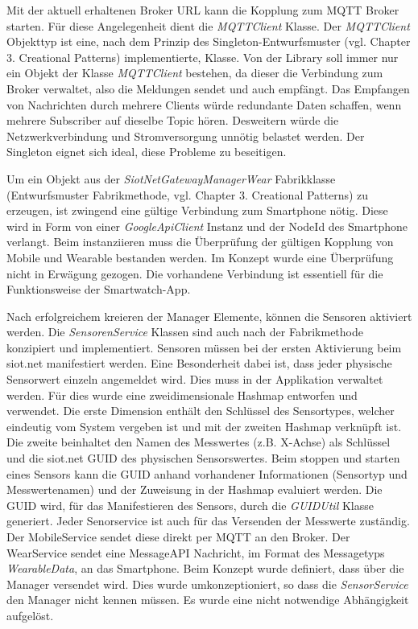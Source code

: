 Mit der aktuell erhaltenen Broker URL kann die Kopplung zum \gls{MQTT} Broker starten. Für diese Angelegenheit dient die \textit{MQTTClient} Klasse. Der \textit{MQTTClient} Objekttyp ist eine, nach dem Prinzip des Singleton-Entwurfsmuster (vgl. \cite{gof:design_patterns} Chapter 3. Creational Patterns) implementierte, Klasse. Von der Library soll immer nur ein Objekt der Klasse \textit{MQTTClient} bestehen, da dieser die Verbindung zum Broker verwaltet, also die Meldungen sendet und auch empfängt. Das Empfangen von Nachrichten durch mehrere Clients würde redundante Daten schaffen, wenn mehrere Subscriber auf dieselbe Topic hören. Desweitern würde die Netzwerkverbindung und Stromversorgung unnötig belastet werden. Der Singleton eignet sich ideal, diese Probleme zu beseitigen.

Um ein Objekt aus der \textit{SiotNetGatewayManagerWear} Fabrikklasse (Entwurfsmuster Fabrikmethode, vgl. \cite{gof:design_patterns} Chapter 3. Creational Patterns) zu erzeugen, ist zwingend eine gültige Verbindung zum Smartphone nötig. Diese wird in Form von einer \textit{GoogleApiClient} Instanz und der NodeId des Smartphone verlangt. Beim instanziieren muss die Überprüfung der gültigen Kopplung von Mobile und Wearable bestanden werden. Im Konzept wurde eine Überprüfung nicht in Erwägung gezogen. Die vorhandene Verbindung ist essentiell für die Funktionsweise der Smartwatch-App.

Nach erfolgreichem kreieren der Manager Elemente, können die Sensoren aktiviert werden. Die \textit{SensorenService} Klassen sind auch nach der Fabrikmethode konzipiert und implementiert. Sensoren müssen bei der ersten Aktivierung beim siot.net manifestiert werden. Eine Besonderheit dabei ist, dass jeder physische Sensorwert einzeln angemeldet wird. Dies muss in der Applikation verwaltet werden. Für dies wurde eine zweidimensionale Hashmap entworfen und verwendet. Die erste Dimension enthält den Schlüssel des Sensortypes, welcher eindeutig vom System vergeben ist und mit der zweiten Hashmap verknüpft ist. Die zweite beinhaltet den Namen des Messwertes (z.B. X-Achse) als Schlüssel und die siot.net \gls{GUID} des physischen Sensorswertes. Beim stoppen und starten eines Sensors kann die \gls{GUID} anhand vorhandener Informationen (Sensortyp und Messwertenamen) und der Zuweisung in der Hashmap evaluiert werden. Die \gls{GUID} wird, für das Manifestieren des Sensors, durch die \textit{GUIDUtil} Klasse generiert. Jeder Senorservice ist auch für das Versenden der Messwerte zuständig. Der MobileService sendet diese direkt per \gls{MQTT} an den Broker. Der WearService sendet eine Message\gls{API} Nachricht, im Format des Messagetyps \textit{WearableData}, an das Smartphone. Beim Konzept wurde definiert, dass über die Manager versendet wird. Dies wurde umkonzeptioniert, so dass die \textit{SensorService} den Manager nicht kennen müssen. Es wurde eine nicht notwendige Abhängigkeit aufgelöst.

